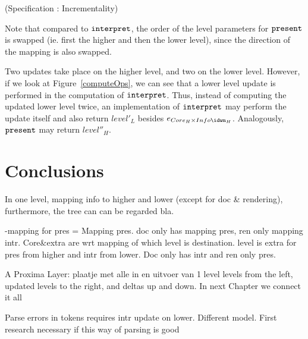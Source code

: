 \begin{center}(Specification \thespecification: Incrementality)\end{center}\vspace{1em}

Note that compared to ${\tt interpret}$, the order of the level parameters for 
${\tt present}$ is swapped (ie. first the higher and then the lower level), since the direction of the mapping is also swapped. 

Two updates take place on the higher level, and two on the lower level. However, if we look at Figure~\ref{computeOps}, we can see that a lower level update is performed in the computation of
 ${\tt interpret}$. Thus, instead of computing the updated lower level twice, an implementation of 
 ${\tt interpret}$ may perform the update itself and also return $level'_{L}$ besides
 $e_{Core_{H} \times Info\idwn_{H}}$.  Analogously, ${\tt present}$ may return $level''_{H}$. 
 



%																
\section{Conclusions}

\toHere     %

In one level,  mapping info to higher and lower (except for doc \& rendering), furthermore, the tree can can be regarded bla.

-mapping for pres = Mapping pres. doc only has mapping pres, ren only mapping intr. Core\&extra are wrt mapping of which level is destination. level is extra for pres from higher and intr from lower. Doc only has intr  and ren only pres.

A Proxima Layer:
plaatje met alle in en uitvoer van 1 level
levels from the left, updated levels to the right, and deltas up and down. In next Chapter we connect it all


Parse errors in tokens requires intr update on lower. Different model. First research necessary if this way of parsing is good



